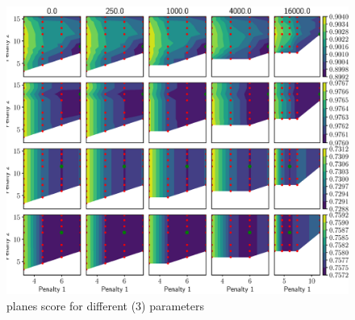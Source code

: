 \documentclass  [
  paper    = a4,
  BCOR     = 10mm,
  twoside,
  fontsize = 12pt,
  fleqn,
  toc      = bibnumbered,
  toc      = listofnumbered,
  numbers  = noendperiod,
  headings = normal,
  listof   = leveldown,
  version  = 3.03
]                                       {scrreprt}
\begin{document}
\begin{figure}
	\centering
	\includegraphics[width=1\linewidth]{images/sgm_params_contour_mae_planes}
	\caption[planes score for different (3) parameters]{planes score for different (3) parameters}
	\label{fig:sgmparamscontourdmae}
\end{figure}
\end{document}
